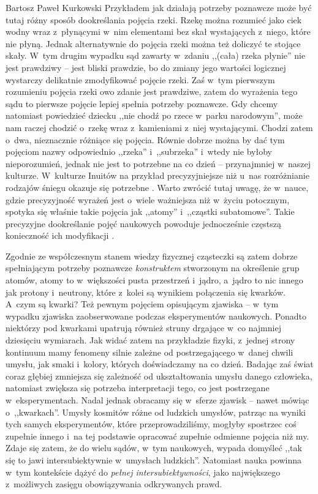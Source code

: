 \begin{artplenv}{Bartosz Paweł Kurkowski}
Przykładem jak działają potrzeby poznawcze może być tutaj różny sposób dookreślania pojęcia rzeki. Rzekę można rozumieć
jako ciek wodny wraz z~płynącymi w~nim elementami bez skał wystających z~niego, które nie płyną. Jednak alternatywnie
do pojęcia rzeki można też doliczyć te stojące skały. W~tym drugim wypadku sąd zawarty w~zdaniu ,,(cała) rzeka płynie''
nie jest prawdziwy -- jest bliski prawdzie, bo do zmiany jego wartości logicznej wystarczy delikatnie zmodyfikować
pojęcie rzeki. Zaś w~tym pierwszym rozumieniu pojęcia rzeki owo zdanie jest prawdziwe, zatem do wyrażenia tego sądu to
pierwsze pojęcie lepiej spełnia potrzeby poznawcze. Gdy chcemy natomiast powiedzieć dziecku ,,nie chodź po rzece w~parku
narodowym'', może nam raczej chodzić o~rzekę wraz z~kamieniami z~niej wystającymi. Chodzi zatem o~dwa, nieznacznie
różniące się pojęcia. Równie dobrze można by dać tym pojęciom nazwy odpowiednio ,,rzeka'' i~,,subrzeka'' i~wtedy nie byłoby
nieporozumień, jednak nie jest to potrzebne na co dzień -- przynajmniej w~naszej kulturze. W~kulturze Inuitów na
przykład precyzyjniejsze niż u~nas rozróżnianie rodzajów śniegu okazuje się potrzebne
\parencite[s.~148]{grobler_prawda_2000}.
Warto zwrócić tutaj uwagę, że w~nauce, gdzie precyzyjność wyrażeń jest
o~wiele ważniejsza niż w~życiu potocznym, spotyka się właśnie takie pojęcia jak ,,atomy'' i~,,cząstki subatomowe''. Takie
precyzyjne dookreślanie pojęć naukowych powoduje jednocześnie częstszą konieczność ich modyfikacji
\parencite[s.~118–122]{grobler_prawda_2000}.


Zgodnie ze współczesnym stanem wiedzy fizycznej cząsteczki są zatem dobrze spełniającym potrzeby poznawcze
\textit{konstruktem} stworzonym na określenie grup atomów, atomy to w~większości pusta przestrzeń i~jądro, a~jądro to
nic innego jak protony i~neutrony, które z~kolei są wynikiem połączenia się kwarków. A~czym są kwarki? Też pewnym
pojęciem opisującym zjawiska -- w~tym wypadku zjawiska zaobserwowane podczas eksperymentów naukowych. Ponadto niektórzy
pod kwarkami upatrują również struny drgające w~co najmniej dziesięciu wymiarach. Jak widać zatem na przykładzie
fizyki, z~jednej strony kontinuum mamy fenomeny silnie zależne od postrzegającego w~danej chwili umysłu, jak
smaki i~kolory, których doświadczamy na co dzień. Badając zaś świat coraz głębiej zmniejsza się zależność od ukształtowania umysłu
danego człowieka, natomiast zwiększa się potrzeba interpretacji tego, co jest postrzegane w~eksperymentach. Nadal
jednak obracamy się w~sferze zjawisk -- nawet mówiąc o~,,kwarkach''. Umysły kosmitów różne od ludzkich umysłów, patrząc na
wyniki tych samych eksperymentów, które przeprowadziliśmy, mogłyby spostrzec coś zupełnie innego i~na tej podstawie
opracować zupełnie odmienne pojęcia niż my. Zdaje się zatem, że do wielu sądów, w~tym naukowych, wypada domyśleć ,,tak
się to jawi intersubiektywnie w~umysłach ludzkich''. Natomiast nauka powinna w~tym kontekście dążyć do \textit{pełnej
intersubiektywności}, jako największego z~możliwych zasięgu obowiązywania odkrywanych prawd.



\end{artplenv}
